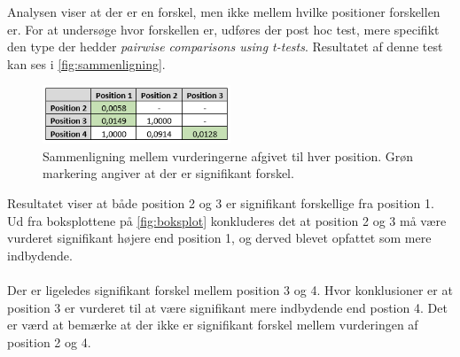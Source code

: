Analysen viser at der er en forskel, men ikke mellem hvilke positioner forskellen er. For at undersøge hvor forskellen er, udføres der post hoc test, mere specifikt den type der hedder \textit{pairwise comparisons using t-tests}. Resultatet af denne test kan ses i \autoref{fig:sammenligning}.
\begin{figure}[H]
\centering
\includegraphics[width = 0.5\textwidth]{Figure/PostHocExcel.PNG} 
\caption{Sammenligning mellem vurderingerne afgivet til hver position. Grøn markering angiver at der er signifikant forskel.}
\label{fig:sammenligning}
\end{figure}

\noindent Resultatet viser at både position 2 og 3 er signifikant forskellige fra position 1. Ud fra boksplottene på \autoref{fig:boksplot} konkluderes det at position 2 og 3 må være vurderet signifikant højere end position 1, og derved blevet opfattet som mere indbydende. 
\\\\
Der er ligeledes signifikant forskel mellem position 3 og 4. Hvor konklusioner er at position 3 er vurderet til at være signifikant mere indbydende end postion 4. Det er værd at bemærke at der ikke er signifikant forskel mellem vurderingen af position 2 og 4. 
